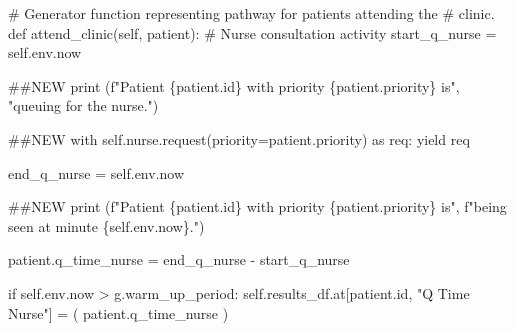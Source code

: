 \documentclass[
  letterpaper,
  DIV=11,
  numbers=noendperiod]{scrreprt}
\newenvironment{Shaded}{}{}
\newcommand{\BuiltInTok}[1]{\textcolor[rgb]{0.84,0.23,0.29}{#1}}
\newcommand{\CommentTok}[1]{\textcolor[rgb]{0.42,0.45,0.49}{#1}}
\newcommand{\ControlFlowTok}[1]{\textcolor[rgb]{0.84,0.23,0.29}{#1}}
\newcommand{\ImportTok}[1]{\textcolor[rgb]{0.01,0.18,0.38}{#1}}
\newcommand{\KeywordTok}[1]{\textcolor[rgb]{0.84,0.23,0.29}{#1}}
\newcommand{\NormalTok}[1]{\textcolor[rgb]{0.14,0.16,0.18}{#1}}
\newcommand{\OperatorTok}[1]{\textcolor[rgb]{0.14,0.16,0.18}{#1}}
\newcommand{\SpecialCharTok}[1]{\textcolor[rgb]{0.00,0.36,0.77}{#1}}
\newcommand{\SpecialStringTok}[1]{\textcolor[rgb]{0.01,0.18,0.38}{#1}}
\newcommand{\StringTok}[1]{\textcolor[rgb]{0.01,0.18,0.38}{#1}}
\newcommand{\VariableTok}[1]{\textcolor[rgb]{0.89,0.38,0.04}{#1}}
\begin{document}
\begin{Shaded}
\begin{Highlighting}[]
\CommentTok{\# Generator function representing pathway for patients attending the}
    \CommentTok{\# clinic.}
    \KeywordTok{def}\NormalTok{ attend\_clinic(}\VariableTok{self}\NormalTok{, patient):}
        \CommentTok{\# Nurse consultation activity}
\NormalTok{        start\_q\_nurse }\OperatorTok{=} \VariableTok{self}\NormalTok{.env.now}

        \CommentTok{\#\#NEW}
        \BuiltInTok{print}\NormalTok{ (}\SpecialStringTok{f"Patient }\SpecialCharTok{\{}\NormalTok{patient}\SpecialCharTok{.}\BuiltInTok{id}\SpecialCharTok{\}}\SpecialStringTok{ with priority }\SpecialCharTok{\{}\NormalTok{patient}\SpecialCharTok{.}\NormalTok{priority}\SpecialCharTok{\}}\SpecialStringTok{ is"}\NormalTok{,}
               \StringTok{"queuing for the nurse."}\NormalTok{)}

        \CommentTok{\#\#NEW}
        \ControlFlowTok{with} \VariableTok{self}\NormalTok{.nurse.request(priority}\OperatorTok{=}\NormalTok{patient.priority) }\ImportTok{as}\NormalTok{ req:}
            \ControlFlowTok{yield}\NormalTok{ req}

\NormalTok{            end\_q\_nurse }\OperatorTok{=} \VariableTok{self}\NormalTok{.env.now}

            \CommentTok{\#\#NEW}
            \BuiltInTok{print}\NormalTok{ (}\SpecialStringTok{f"Patient }\SpecialCharTok{\{}\NormalTok{patient}\SpecialCharTok{.}\BuiltInTok{id}\SpecialCharTok{\}}\SpecialStringTok{ with priority }\SpecialCharTok{\{}\NormalTok{patient}\SpecialCharTok{.}\NormalTok{priority}\SpecialCharTok{\}}\SpecialStringTok{ is"}\NormalTok{,}
                   \SpecialStringTok{f"being seen at minute }\SpecialCharTok{\{}\VariableTok{self}\SpecialCharTok{.}\NormalTok{env}\SpecialCharTok{.}\NormalTok{now}\SpecialCharTok{\}}\SpecialStringTok{."}\NormalTok{)}

\NormalTok{            patient.q\_time\_nurse }\OperatorTok{=}\NormalTok{ end\_q\_nurse }\OperatorTok{{-}}\NormalTok{ start\_q\_nurse}

            \ControlFlowTok{if} \VariableTok{self}\NormalTok{.env.now }\OperatorTok{\textgreater{}}\NormalTok{ g.warm\_up\_period:}
                \VariableTok{self}\NormalTok{.results\_df.at[patient.}\BuiltInTok{id}\NormalTok{, }\StringTok{"Q Time Nurse"}\NormalTok{] }\OperatorTok{=}\NormalTok{ (}
\NormalTok{                    patient.q\_time\_nurse}
\NormalTok{                )}


\end{Highlighting}
\end{Shaded}
\end{document}
